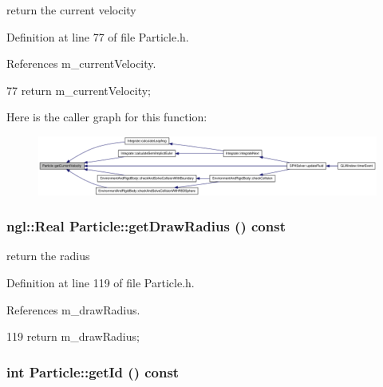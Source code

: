 return the current velocity 



Definition at line 77 of file Particle.h.



References m\_\-currentVelocity.




\begin{DoxyCode}
77 { return m_currentVelocity; }
\end{DoxyCode}




Here is the caller graph for this function:\nopagebreak
\begin{figure}[H]
\begin{center}
\leavevmode
\includegraphics[width=420pt]{class_particle_af19d3d862218eda779fc03d5e1678abe_icgraph}
\end{center}
\end{figure}


\hypertarget{class_particle_afeef52fff1d0ad2d8580c6245f5ef743}{
\subsubsection[{getDrawRadius}]{\setlength{\rightskip}{0pt plus 5cm}ngl::Real Particle::getDrawRadius () const}}
\label{class_particle_afeef52fff1d0ad2d8580c6245f5ef743}


return the radius 



Definition at line 119 of file Particle.h.



References m\_\-drawRadius.




\begin{DoxyCode}
119 { return m_drawRadius; }
\end{DoxyCode}


\hypertarget{class_particle_ad9688047786047c9fecf0c304b4f6294}{
\subsubsection[{getId}]{\setlength{\rightskip}{0pt plus 5cm}int Particle::getId () const}}
\label{class_particle_ad9688047786047c9fecf0c304b4f6294}


